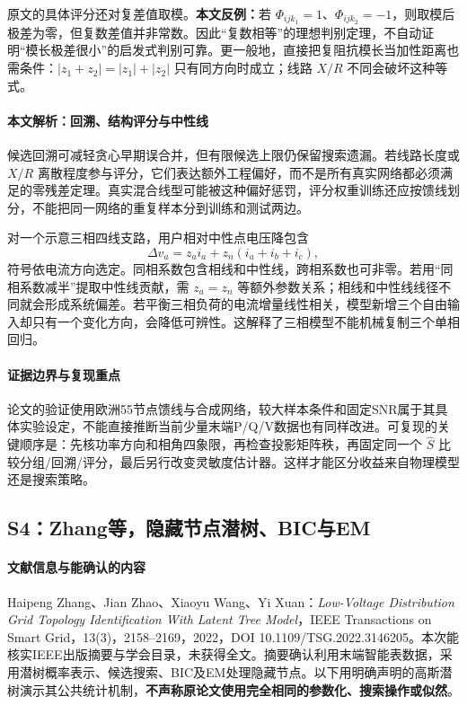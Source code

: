 \documentclass[UTF8,11pt,fontset=fandol]{ctexart}
\theoremstyle{remark}
\numberwithin{equation}{section}
\begin{document}
原文的具体评分还对复差值取模。\textbf{本文反例：}若 $\Phi_{ijk_1}=1$、$\Phi_{ijk_2}=-1$，则取模后极差为零，但复数差值并非常数。因此“复数相等”的理想判别定理，不自动证明“模长极差很小”的启发式判别可靠。更一般地，直接把复阻抗模长当加性距离也需条件：$|z_1+z_2|=|z_1|+|z_2|$ 只有同方向时成立；线路 $X/R$ 不同会破坏这种等式。

\paragraph{本文解析：回溯、结构评分与中性线}
候选回溯可减轻贪心早期误合并，但有限候选上限仍保留搜索遗漏。若线路长度或 $X/R$ 离散程度参与评分，它们表达额外工程偏好，而不是所有真实网络都必须满足的零残差定理。真实混合线型可能被这种偏好惩罚，评分权重训练还应按馈线划分，不能把同一网络的重复样本分到训练和测试两边。

对一个示意三相四线支路，用户相对中性点电压降包含
\begin{equation}
 \Delta v_a=z_a i_a+z_n(i_a+i_b+i_c),
\end{equation}
符号依电流方向选定。同相系数包含相线和中性线，跨相系数也可非零。若用“同相系数减半”提取中性线贡献，需 $z_a=z_n$ 等额外参数关系；相线和中性线线径不同就会形成系统偏差。若平衡三相负荷的电流增量线性相关，模型新增三个自由输入却只有一个变化方向，会降低可辨性。这解释了三相模型不能机械复制三个单相回归。

\paragraph{证据边界与复现重点}
论文的验证使用欧洲55节点馈线与合成网络，较大样本条件和固定SNR属于其具体实验设定，不能直接推断当前少量末端P/Q/V数据也有同样改进。可复现的关键顺序是：先核功率方向和相角四象限，再检查投影矩阵秩，再固定同一个 $\widehat S$ 比较分组/回溯/评分，最后另行改变灵敏度估计器。这样才能区分收益来自物理模型还是搜索策略。

\subsection{S4：Zhang等，隐藏节点潜树、BIC与EM}
\paragraph{文献信息与能确认的内容}
Haipeng Zhang、Jian Zhao、Xiaoyu Wang、Yi Xuan：\emph{Low-Voltage Distribution Grid Topology Identification With Latent Tree Model}，IEEE Transactions on Smart Grid，13(3)，2158--2169，2022，DOI 10.1109/TSG.2022.3146205\citep{S4}。本次能核实IEEE出版摘要与学会目录，未获得全文。摘要确认利用末端智能表数据，采用潜树概率表示、候选搜索、BIC及EM处理隐藏节点。以下用明确声明的高斯潜树演示其公共统计机制，\textbf{不声称原论文使用完全相同的参数化、搜索操作或似然}。
\end{document}
